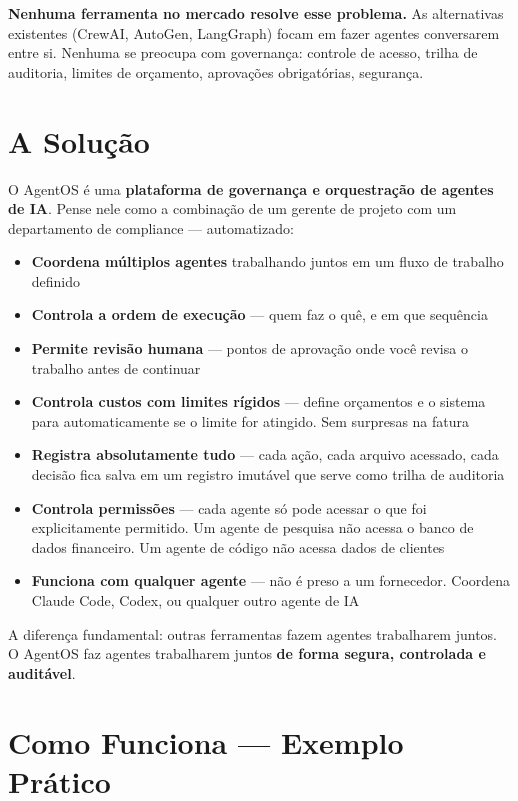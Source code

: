 \documentclass[12pt, a4paper]{article}
\begin{document}
\textbf{Nenhuma ferramenta no mercado resolve esse problema.} As alternativas existentes (CrewAI, AutoGen, LangGraph) focam em fazer agentes conversarem entre si. Nenhuma se preocupa com governança: controle de acesso, trilha de auditoria, limites de orçamento, aprovações obrigatórias, segurança.

\section{A Solução}

O AgentOS é uma \textbf{plataforma de governança e orquestração de agentes de IA}. Pense nele como a combinação de um gerente de projeto com um departamento de compliance --- automatizado:

\begin{itemize}[leftmargin=1.5em]
    \item \textbf{Coordena múltiplos agentes} trabalhando juntos em um fluxo de trabalho definido
    \item \textbf{Controla a ordem de execução} --- quem faz o quê, e em que sequência
    \item \textbf{Permite revisão humana} --- pontos de aprovação onde você revisa o trabalho antes de continuar
    \item \textbf{Controla custos com limites rígidos} --- define orçamentos e o sistema para automaticamente se o limite for atingido. Sem surpresas na fatura
    \item \textbf{Registra absolutamente tudo} --- cada ação, cada arquivo acessado, cada decisão fica salva em um registro imutável que serve como trilha de auditoria
    \item \textbf{Controla permissões} --- cada agente só pode acessar o que foi explicitamente permitido. Um agente de pesquisa não acessa o banco de dados financeiro. Um agente de código não acessa dados de clientes
    \item \textbf{Funciona com qualquer agente} --- não é preso a um fornecedor. Coordena Claude Code, Codex, ou qualquer outro agente de IA
\end{itemize}

A diferença fundamental: outras ferramentas fazem agentes trabalharem juntos. O AgentOS faz agentes trabalharem juntos \textbf{de forma segura, controlada e auditável}.

\section{Como Funciona --- Exemplo Prático}
\end{document}
